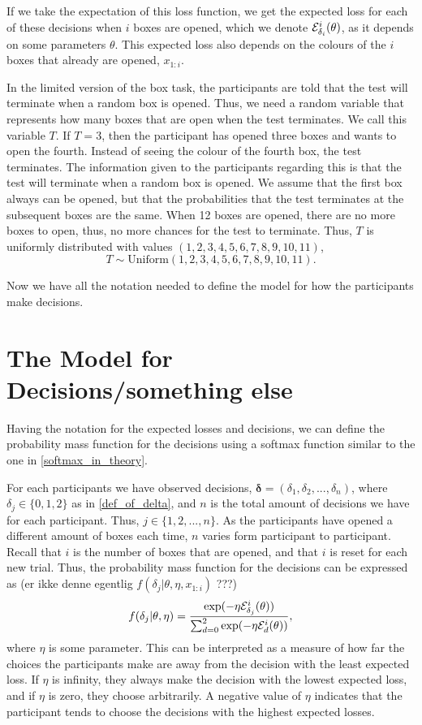 If we take the expectation of this loss function, we get the expected loss for each of these decisions when $i$ boxes are opened, which we denote $\mathcal{E}^i_{\delta_i}(\theta)$, as it depends on some parameters $\theta$. This expected loss also depends on the colours of the $i$ boxes that already are opened, $x_{1:i}$.

In the limited version of the box task, the participants are told that the test will terminate when a random box is opened. Thus, we need a random variable that represents how many boxes that are open when the test terminates. We call this variable $T$. If $T=3$, then the participant has opened three boxes and wants to open the fourth. Instead of seeing the colour of the fourth box, the test terminates. The information given to the participants regarding this is that the test will terminate when a random box is opened. We assume that the first box always can be opened, but that the probabilities that the test terminates at the subsequent boxes are the same. When 12 boxes are opened, there are no more boxes to open, thus, no more chances for the test to terminate. Thus, $T$ is uniformly distributed with values $(1,2,3,4,5,6,7,8,9,10,11)$, 
\begin{equation}
\label{T_uniform}
    T \sim \text{Uniform}({1,2,3,4,5,6,7,8,9,10,11}).
\end{equation}

Now we have all the notation needed to define the model for how the participants make decisions. 

\section{The Model for Decisions/something else}
Having the notation for the expected losses and decisions, we can define the probability mass function for the decisions using a softmax function similar to the one in \eqref{softmax_in_theory}. 

For each participants we have observed decisions, $\boldsymbol{\delta}=(\delta_1,\delta_2,...,\delta_n)$, where $\delta_j \in \{0,1,2 \}$ as in \eqref{def_of_delta}, and $n$ is the total amount of decisions we have for each participant. Thus, $j\in \{1,2,...,n \}$. As the participants have opened a different amount of boxes each time, $n$ varies form participant to participant. Recall that $i$ is the number of boxes that are opened, and that $i$ is reset for each new trial. Thus, the probability mass function for the decisions can be expressed as (er ikke denne egentlig $f(\delta_j|\theta,\eta,x_{1:i})$ ???)
\begin{equation}
\label{softmax_theta}
    f(\delta_{j}|\theta,\eta) = \frac{\text{exp}(- \eta \mathcal{E}^i_{\delta_{j}}(\theta))}{\sum_{d=0}^{2} \text{exp}(-\eta \mathcal{E}^i_{d}(\theta))},
\end{equation}
where $\eta$ is some parameter. This can be interpreted as a measure of how far the choices the participants make are away from the decision with the least expected loss. If $\eta$ is infinity, they always make the decision with the lowest expected loss, and if $\eta$ is zero, they choose arbitrarily. A negative value of $\eta$ indicates that the participant tends to choose the decisions with the highest expected losses.


